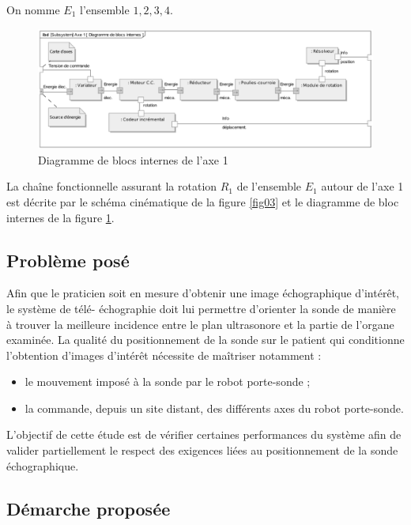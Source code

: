 On nomme $E_1$ l'ensemble ${1, 2, 3, 4}$.

\begin{figure}[ht!]
\begin{center}
 \includegraphics[width=0.9\linewidth]{img/fig04}
\end{center}
\caption{Diagramme de blocs internes de l'axe 1}
\label{fig04}
\end{figure}

La chaîne fonctionnelle assurant la rotation $R_1$ de l'ensemble $E_1$ autour de l'axe 1 est décrite par le schéma cinématique de la figure \ref{fig03} et le diagramme de bloc internes de la figure \ref{fig04}.

\subsection{Problème posé}

Afin que le praticien soit en mesure d'obtenir une image échographique d'intérêt, le système de télé- échographie doit lui permettre d'orienter la sonde de manière à trouver la meilleure incidence entre le plan ultrasonore et la partie de l'organe examinée. La qualité du positionnement de la sonde sur le patient qui conditionne l'obtention d'images d'intérêt nécessite de maîtriser notamment : 
\begin{itemize}
 \item le mouvement imposé à la sonde par le robot porte-sonde ;
 \item la commande, depuis un site distant, des différents axes du robot porte-sonde.
\end{itemize}

L'objectif de cette étude est de vérifier certaines performances du système afin de valider partiellement le respect des exigences liées au positionnement de la sonde échographique. 

\subsection{Démarche proposée}

